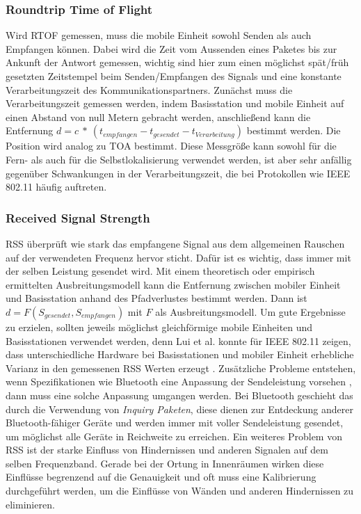 \subsubsection{Roundtrip Time of Flight}
Wird RTOF gemessen, muss die mobile Einheit sowohl Senden als auch Empfangen können. 
Dabei wird die Zeit vom Aussenden eines Paketes bis zur Ankunft der Antwort gemessen, wichtig sind hier zum einen möglichst spät/früh gesetzten Zeitstempel beim Senden/Empfangen des Signals und eine konstante Verarbeitungszeit des Kommunikationspartners. 
Zunächst muss die Verarbeitungszeit gemessen werden, indem Basisstation und mobile Einheit auf einen Abstand von null Metern gebracht werden, anschließend kann die Entfernung $d = c\ *\ (t_{empfangen} - t_{gesendet} - t_{Verarbeitung})$ bestimmt werden. 
Die Position wird analog zu TOA bestimmt. Diese Messgröße kann sowohl für die Fern- als auch für die Selbstlokalisierung verwendet werden, ist aber sehr anfällig gegenüber Schwankungen in der Verarbeitungszeit, die bei Protokollen wie IEEE 802.11 häufig auftreten. 

\subsubsection{Received Signal Strength}
RSS überprüft wie stark das empfangene Signal aus dem allgemeinen Rauschen auf der verwendeten Frequenz hervor sticht. 
Dafür ist es wichtig, dass immer mit der selben Leistung gesendet wird. 
Mit einem theoretisch oder empirisch ermittelten Ausbreitungsmodell kann die Entfernung zwischen mobiler Einheit und Basisstation anhand des Pfadverlustes bestimmt werden. 
Dann ist $d = F(S_{gesendet},S_{empfangen})$ mit $F$ als Ausbreitungsmodell. 
Um gute Ergebnisse zu erzielen, sollten jeweils möglichst gleichförmige mobile Einheiten und Basisstationen verwendet werden, denn Lui et al. konnte für IEEE 802.11 zeigen, dass unterschiedliche Hardware bei Basisstationen und mobiler Einheit erhebliche Varianz in den gemessenen RSS Werten erzeugt \cite{lui2011differences}. 
Zusätzliche Probleme entstehen, wenn Spezifikationen wie Bluetooth eine Anpassung der Sendeleistung vorsehen \cite{hossain2007comprehensive}, dann muss eine solche Anpassung umgangen werden. 
Bei Bluetooth geschieht das durch die Verwendung von \emph{Inquiry Paketen}, diese dienen zur Entdeckung anderer Bluetooth-fähiger Geräte und werden immer mit voller Sendeleistung gesendet, um möglichst alle Geräte in Reichweite zu erreichen.
Ein weiteres Problem von RSS ist der starke Einfluss von Hindernissen und anderen Signalen auf dem selben Frequenzband. 
Gerade bei der Ortung in Innenräumen wirken diese Einflüsse begrenzend auf die Genauigkeit und oft muss eine Kalibrierung durchgeführt werden, um die Einflüsse von Wänden und anderen Hindernissen zu eliminieren.



